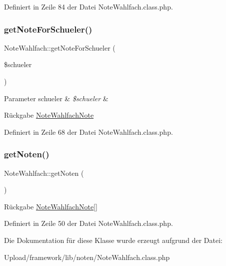 Definiert in Zeile 84 der Datei Note\+Wahlfach.\+class.\+php.

\mbox{\label{class_note_wahlfach_a4c6534c50c430bef00759c235a60edd2}} 
\subsubsection{\texorpdfstring{get\+Note\+For\+Schueler()}{getNoteForSchueler()}}
{\footnotesize\ttfamily Note\+Wahlfach\+::get\+Note\+For\+Schueler (\begin{DoxyParamCaption}\item[{}]{\$schueler }\end{DoxyParamCaption})}


\begin{DoxyParams}[1]{Parameter}
schueler & {\em \$schueler} & \\
\hline
\end{DoxyParams}
\begin{DoxyReturn}{Rückgabe}
\mbox{\hyperlink{class_note_wahlfach_note}{Note\+Wahlfach\+Note}} 
\end{DoxyReturn}


Definiert in Zeile 68 der Datei Note\+Wahlfach.\+class.\+php.

\mbox{\label{class_note_wahlfach_ad97c4ed415adf9c581441f9d5b6897a7}} 
\subsubsection{\texorpdfstring{get\+Noten()}{getNoten()}}
{\footnotesize\ttfamily Note\+Wahlfach\+::get\+Noten (\begin{DoxyParamCaption}{ }\end{DoxyParamCaption})}

\begin{DoxyReturn}{Rückgabe}
\mbox{\hyperlink{class_note_wahlfach_note}{Note\+Wahlfach\+Note}}\mbox{[}\mbox{]} 
\end{DoxyReturn}


Definiert in Zeile 50 der Datei Note\+Wahlfach.\+class.\+php.



Die Dokumentation für diese Klasse wurde erzeugt aufgrund der Datei\+:\begin{DoxyCompactItemize}
\item 
Upload/framework/lib/noten/Note\+Wahlfach.\+class.\+php\end{DoxyCompactItemize}
